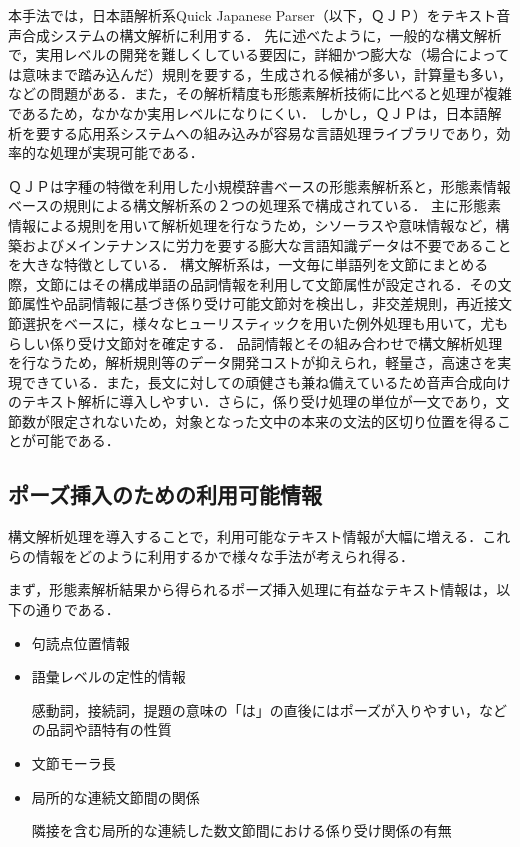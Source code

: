 本手法では，日本語解析系Quick Japanese Parser（以下，ＱＪＰ）\cite[など]{亀田1996,Kameda1996}をテキスト音声合成システムの構文解析に利用する．
先に述べたように，一般的な構文解析で，実用レベルの開発を難しくしている要因に，詳細かつ膨大な（場合によっては意味まで踏み込んだ）規則を要する，生成される候補が多い，計算量も多い，などの問題がある．また，その解析精度も形態素解析技術に比べると処理が複雑であるため，なかなか実用レベルになりにくい．
しかし，ＱＪＰは，日本語解析を要する応用系システムへの組み込みが容易な言語処理ライブラリであり，効率的な処理が実現可能である．

ＱＪＰは字種の特徴を利用した小規模辞書ベースの形態素解析系と，形態素情報ベースの規則による構文解析系の２つの処理系で構成されている．
主に形態素情報による規則を用いて解析処理を行なうため，シソーラスや意味情報など，構築およびメインテナンスに労力を要する膨大な言語知識データは不要であることを大きな特徴としている．
構文解析系は，一文毎に単語列を文節にまとめる際，文節にはその構成単語の品詞情報を利用して文節属性が設定される．その文節属性や品詞情報に基づき係り受け可能文節対を検出し，非交差規則，再近接文節選択をベースに，様々なヒューリスティックを用いた例外処理も用いて，尤もらしい係り受け文節対を確定する．
品詞情報とその組み合わせで構文解析処理を行なうため，解析規則等のデータ開発コストが抑えられ，軽量さ，高速さを実現できている．また，長文に対しての頑健さも兼ね備えているため音声合成向けのテキスト解析に導入しやすい．さらに，係り受け処理の単位が一文であり，文節数が限定されないため，対象となった文中の本来の文法的区切り位置を得ることが可能である．

\subsection{ポーズ挿入のための利用可能情報}

構文解析処理を導入することで，利用可能なテキスト情報が大幅に増える．これらの情報をどのように利用するかで様々な手法が考えられ得る．

まず，形態素解析結果から得られるポーズ挿入処理に有益なテキスト情報は，以下の通りである．

\begin{itemize}

	\item 句読点位置情報

	\item 語彙レベルの定性的情報

		感動詞，接続詞，提題の意味の「は」の直後にはポーズが入りやすい，などの品詞や語特有の性質

	\item 文節モーラ長

	\item 局所的な連続文節間の関係

		隣接を含む局所的な連続した数文節間における係り受け関係の有無

\end{itemize}

